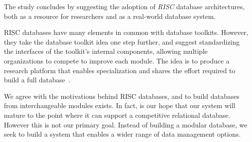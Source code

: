 \documentclass[letterpaper,twocolumn,10pt]{article}
\begin{document}

The study concludes 
by suggesting the adoption of {\em RISC} database architectures, both as a resource for researchers and as a 
real-world database system.

RISC databases have many elements in common with
database toolkits.  However, they take the database toolkit idea one
step further, and suggest standardizing the interfaces of the
toolkit's internal components, allowing multiple organizations to
compete to improve each module.  The idea is to produce a research
platform that enables specialization and shares the effort required to build a full database~\cite{riscDB}.

We agree with the motivations behind RISC databases, and to build 
databases from interchangeable modules exists.  In fact, is our hope
that our system will mature to the point where it can support 
a competitive relational database.  However this is
not our primary goal.  
Instead of building a modular database, we seek
to build a system that enables a wider range of data management options.



\end{document}
